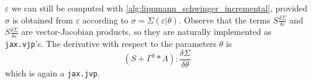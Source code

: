 \documentclass[11pt]{article}
\begin{document}
\begin{algorithm}
    \caption{Adjoint Lippmann Schwinger iteration (generic stress-strain relationship)}
    \label{alg:lippmann_schwinger_adjoint_generic}
\begin{algorithmic}[1]
    \EndFor
\State{\Return $\Lambda$}
\end{algorithmic}
\end{algorithm}
$\varepsilon$ we can still be computed with \cref{alg:lippmann_schwinger_incremental}, provided $\sigma$ is obtained from $\varepsilon$ according to $\sigma=\Sigma(\varepsilon|\theta)$. Observe that the terms $S\frac{\delta \Sigma}{\delta \varepsilon}$ and $S\frac{\delta\Sigma}{\delta\varepsilon}$ are vector-Jacobian products, so they are naturally implemented as \verb~jax.vjp~'s. The derivative with respect to the parameters $\theta$ is
\begin{equation}
\left(S+\Gamma^0*\Lambda\right):\frac{\delta \Sigma}{\delta \theta}
\end{equation}
which is again a \verb~jax.jvp~.
\end{document}
